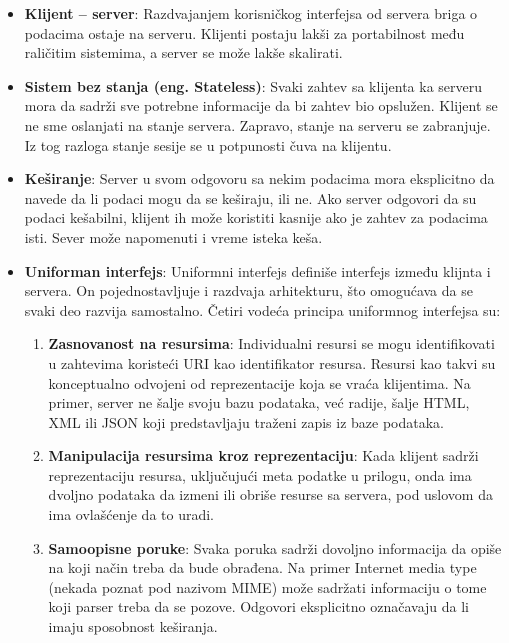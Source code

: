 \begin{itemize}

	\item \textbf{Klijent -- server}: Razdvajanjem korisničkog interfejsa od servera briga o podacima 
	ostaje na serveru. Klijenti postaju lakši za portabilnost među raličitim sistemima, a server se može
    lakše skalirati.
	
    \item \textbf{Sistem bez stanja (eng. Stateless)}: Svaki zahtev sa klijenta ka serveru mora da sadrži 
	sve potrebne informacije da bi zahtev bio opslužen. Klijent se ne sme oslanjati na stanje servera. 
    Zapravo, stanje na serveru se zabranjuje. Iz tog razloga stanje sesije se u potpunosti čuva na klijentu.
	
    \item \textbf{Keširanje}: Server u svom odgovoru sa nekim podacima mora eksplicitno da navede da li 
    podaci mogu da se keširaju, ili ne. Ako server odgovori da su podaci kešabilni, klijent ih može 
    koristiti kasnije ako je zahtev za podacima isti. Sever može napomenuti i vreme isteka keša.
    
    \item \textbf{Uniforman interfejs}: Uniformni interfejs definiše interfejs između klijnta i servera.
    On pojednostavljuje i razdvaja arhitekturu, što omogućava da se svaki deo razvija samostalno. 
    Četiri vodeća principa uniformnog interfejsa su:

    \begin{enumerate}
        \item \textbf{Zasnovanost na resursima}: Individualni resursi se mogu identifikovati u 
        zahtevima koristeći URI kao identifikator resursa. Resursi kao takvi su konceptualno odvojeni 
        od reprezentacije koja se vraća klijentima. Na primer, server ne šalje svoju bazu podataka, 
        već radije, šalje HTML, XML ili JSON koji predstavljaju traženi zapis iz baze podataka.

        \item \textbf{Manipulacija resursima kroz reprezentaciju}: Kada klijent sadrži reprezentaciju resursa,
        uključujući meta podatke u prilogu, onda ima dvoljno podataka da izmeni ili obriše resurse 
        sa servera, pod uslovom da ima ovlašćenje da to uradi.

        \item \textbf{Samoopisne poruke}: Svaka poruka sadrži dovoljno informacija da opiše na koji 
        način treba da bude obrađena. Na primer Internet media type (nekada poznat pod nazivom MIME) 
        može sadržati informaciju o tome koji parser treba da se pozove. Odgovori eksplicitno 
        označavaju da li imaju sposobnost keširanja.


\end{enumerate}
\end{itemize}
